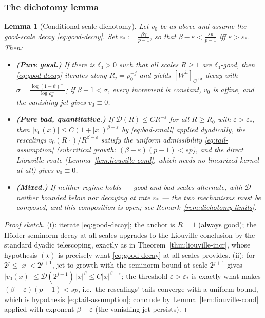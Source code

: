\documentclass[11pt]{amsart}
\theoremstyle{plain}
\newtheorem{lemma}[theorem]{Lemma}
\theoremstyle{definition}
\theoremstyle{remark}
\begin{document}
\subsubsection*{The dichotomy lemma}
\begin{lemma}[Conditional scale dichotomy]\label{lem:dichotomy}
Let $v_0$ be as above and assume the good-scale decay
\eqref{eq:good-decay}. Set $\varepsilon_*:=\frac{\beta\gamma}{p-1}$, so that
$\beta-\varepsilon<\frac{sp}{p-1}$ iff $\varepsilon>\varepsilon_*$. Then:
\begin{itemize}[leftmargin=2em]
\item[\textnormal{(i)}] \textbf{(Pure good.)} If there is $\delta_0>0$ such
that all scales $R\ge1$ are $\delta_0$-good, then \eqref{eq:good-decay}
iterates along $R_j=\rho_0^{-j}$ and yields
$[W^h]_{C^{0,\sigma}}$-decay with
$\sigma=\frac{\log(1-\vartheta)^{-1}}{\log\rho_0^{-1}}$; if
$\beta-1<\sigma$, every increment is constant, $v_0$ is affine, and the
vanishing jet gives $v_0\equiv0$.
\item[\textnormal{(ii)}] \textbf{(Pure bad, quantitative.)} If
$\mathcal D(R)\le C R^{-\varepsilon}$ for all $R\ge R_0$ with
$\varepsilon>\varepsilon_*$, then $|v_0(x)|\le C(1+|x|)^{\beta-\varepsilon}$
by \eqref{eq:bad-small} applied dyadically, the rescalings
$v_0(R\cdot)/R^{\beta-\varepsilon}$ satisfy the uniform admissibility
\eqref{eq:tail-assumption} \textnormal{(}subcritical growth:
$(\beta-\varepsilon)(p-1)<sp$\textnormal{)}, and the \emph{direct}
Liouville route \textnormal{(}Lemma~\ref{lem:liouville-cond}, which needs
no linearized kernel at all\textnormal{)} gives $v_0\equiv0$.
\item[\textnormal{(iii)}] \textbf{(Mixed.)} If neither regime holds ---
good and bad scales alternate, with $\mathcal D$ neither bounded below nor
decaying at rate $\varepsilon_*$ --- the two mechanisms must be composed,
and \emph{this composition is open}; see
Remark~\ref{rem:dichotomy-limits}.
\end{itemize}
\end{lemma}
\begin{proof}[Proof sketch]
(i): iterate \eqref{eq:good-decay}; the anchor is $R=1$
\textnormal{(}always good\textnormal{)}; the H\"older seminorm decay at all
scales upgrades to the Liouville conclusion by the standard dyadic
telescoping, exactly as in Theorem~\ref{thm:liouville-incr}, whose
hypothesis $(\star)$ is precisely what \eqref{eq:good-decay}-at-all-scales
provides. (ii): for $2^j\le|x|<2^{j+1}$, jet-to-growth with the seminorm
bound at scale $2^{j+1}$ gives
$|v_0(x)|\le\mathcal D(2^{j+1})\,|x|^{\beta}\le C|x|^{\beta-\varepsilon}$;
the threshold $\varepsilon>\varepsilon_*$ is exactly what makes
$(\beta-\varepsilon)(p-1)<sp$, i.e.\ the rescalings' tails converge with a
uniform bound, which is hypothesis \eqref{eq:tail-assumption}; conclude by
Lemma~\ref{lem:liouville-cond} applied with exponent $\beta-\varepsilon$
\textnormal{(}the vanishing jet persists\textnormal{)}.
\end{proof}
\end{document}
